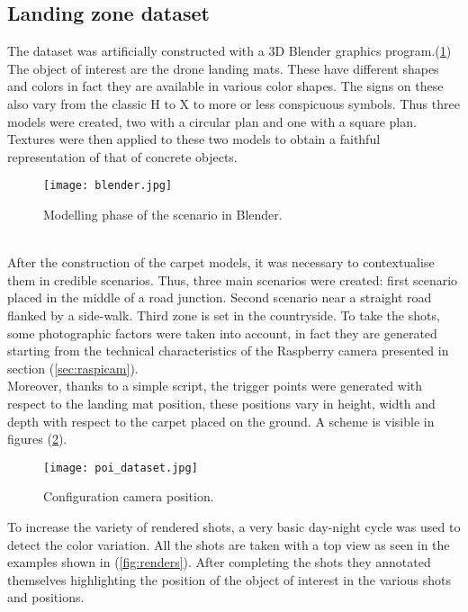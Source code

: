 \subsection{Landing zone dataset}
\label{ssec:landing-zone}
%
The dataset was artificially constructed with a 3D Blender graphics program.(\ref{fig:blender})\\ 
The object of interest are the drone landing mats. These have different shapes
and colors in fact they are available in various color shapes. The signs on
these also vary from the classic H to X to more or less conspicuous symbols.
Thus three models were created, two with a circular plan and one with a square
plan. 
Textures were then applied to these two models to obtain a faithful
representation of that of concrete objects. \linebreak
%
\begin{figure}[htb]
	\centering
	\texttt{[image: blender.jpg]}
	\caption{Modelling phase of the scenario in Blender.}
	\label{fig:blender}
\end{figure}
%
\\\noindent After the construction of the carpet models, it was necessary to contextualise 
them in credible scenarios.
Thus, three main scenarios were created: first scenario placed in the middle of a road
junction. Second scenario near a straight road flanked by a side-walk.
Third zone is set in the countryside. To take the shots, some photographic
factors were taken into account, in fact they are generated starting from the
technical characteristics of the Raspberry camera presented in section
(\ref{sec:raspicam}).\\
Moreover, thanks to a simple script, the trigger points
were generated with respect to the landing mat position, these positions vary in
height, width and depth with respect to the carpet placed on the ground.
A scheme is visible in figures (\ref{fig:poi_dataset}). \hfill \break
%
\begin{figure}[htb]
	\centering
	\texttt{[image: poi\_dataset.jpg]}
	\caption{Configuration camera position.}
	\label{fig:poi_dataset}
\end{figure}
%
\newpage
To increase the variety of rendered shots, a very basic day-night cycle was
used to detect the color variation. All the shots are taken with a top view as
seen in the examples shown in (\ref{fig:renders}).
After completing the shots they annotated themselves highlighting the position
of the object of interest in the various shots and positions.\\
